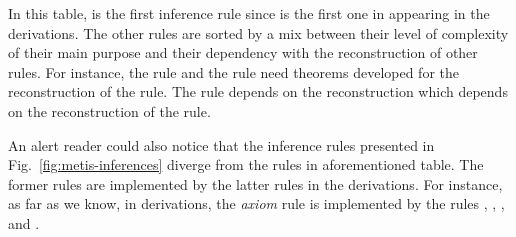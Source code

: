 \documentclass[../paper.tex]{subfiles}
\begin{document}
In this table, \strip is the first inference rule since is the first
one in appearing in the \TSTP derivations. The other rules are sorted
by a mix between their level of complexity of their main purpose and
their dependency with the reconstruction of other rules. For
instance, the \simplify rule and the \clausify rule need theorems
developed for the reconstruction of the \canonicalize rule. The
\canonicalize rule depends on the \resolve reconstruction which
depends on the reconstruction of the \conjunct rule.

An alert reader could also notice that the inference rules presented in
Fig.~\ref{fig:metis-inferences} diverge from the rules in
aforementioned table. The former rules are implemented by the latter
rules in the \TSTP derivations. For instance, as far as we know, in
\TSTP derivations,  the \emph{axiom} rule is implemented by the rules
\canonicalize, \clausify, \conjunct, and \simplify.

\end{document}
